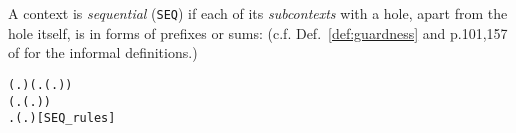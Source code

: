 A context is \emph{sequential} (\texttt{SEQ}) if each of its \emph{subcontexts} with
a hole, apart from the hole itself, is in forms of prefixes or sums:
(c.f. Def.~\ref{def:guardness} and p.101,157 of \cite{Mil89} for
the informal definitions.)
 \begin{alltt}
\HOLTokenTurnstile{}  (\HOLTokenLambda{}. ) \HOLSymConst{\HOLTokenConj{}} (\HOLSymConst{\HOLTokenForall{}}.  (\HOLTokenLambda{}. )) \HOLSymConst{\HOLTokenConj{}}
   (\HOLSymConst{\HOLTokenForall{}} .   \HOLSymConst{\HOLTokenImp{}}  (\HOLTokenLambda{}.  )) \HOLSymConst{\HOLTokenConj{}}
   \HOLSymConst{\HOLTokenForall{}} .   \HOLSymConst{\HOLTokenConj{}}   \HOLSymConst{\HOLTokenImp{}}  (\HOLTokenLambda{}.   \HOLSymConst{\ensuremath{+}}  )\hfill{[SEQ_rules]}
\end{alltt}

